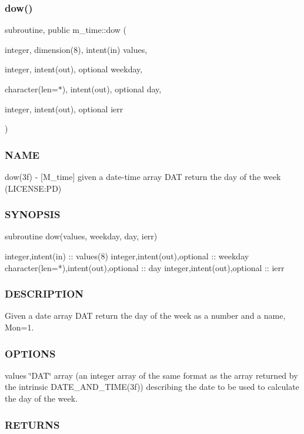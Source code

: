\subsubsection{\texorpdfstring{dow()}{dow()}}
{\footnotesize\ttfamily subroutine, public m\+\_\+time\+::dow (\begin{DoxyParamCaption}\item[{integer, dimension(8), intent(in)}]{values,  }\item[{integer, intent(out), optional}]{weekday,  }\item[{character(len=$\ast$), intent(out), optional}]{day,  }\item[{integer, intent(out), optional}]{ierr }\end{DoxyParamCaption})}



\subsubsection*{N\+A\+ME}

dow(3f) -\/ \mbox{[}M\+\_\+time\mbox{]} given a date-\/time array D\+AT return the day of the week (L\+I\+C\+E\+N\+SE\+:PD) 

\subsubsection*{S\+Y\+N\+O\+P\+S\+IS}

\begin{DoxyVerb}subroutine dow(values, weekday, day, ierr)

 integer,intent(in) :: values(8)
 integer,intent(out),optional :: weekday
 character(len=*),intent(out),optional :: day
 integer,intent(out),optional :: ierr
\end{DoxyVerb}


\subsubsection*{D\+E\+S\+C\+R\+I\+P\+T\+I\+ON}

Given a date array D\+AT return the day of the week as a number and a name, Mon=1.

\subsubsection*{O\+P\+T\+I\+O\+NS}

values \char`\"{}\+D\+A\+T\char`\"{} array (an integer array of the same format as the array returned by the intrinsic D\+A\+T\+E\+\_\+\+A\+N\+D\+\_\+\+T\+I\+M\+E(3f)) describing the date to be used to calculate the day of the week. \subsubsection*{R\+E\+T\+U\+R\+NS}

